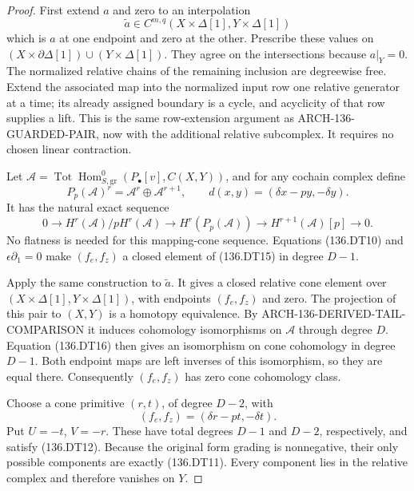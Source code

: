 \begin{proof}
First extend \(a\) and zero to an interpolation
\[
  \widetilde a\in C^{m,q}(X\times\Delta[1],Y\times\Delta[1])
                                                        \tag{136.DT14}
\]
which is \(a\) at one endpoint and zero at the other.
Prescribe these values on
\((X\times\partial\Delta[1])\cup(Y\times\Delta[1])\).
They agree on the intersections because \(a|_Y=0\).
The normalized relative chains of the remaining inclusion are
degreewise free. Extend the associated map into the normalized
input row one relative generator at a time; its already assigned
boundary is a cycle, and acyclicity of that row supplies a lift.
This is the same row-extension argument as
ARCH-136-GUARDED-PAIR, now with the additional relative subcomplex.
It requires no chosen linear contraction.

Let \(\mathcal A=\operatorname{Tot}
\operatorname{Hom}^{0}_{S,\mathrm{gr}}
(P_\bullet[v],C(X,Y))\), and for any cochain complex define
\[
 P_p(\mathcal A)^r=\mathcal A^r\oplus\mathcal A^{r+1},
 \qquad d(x,y)=(\delta x-py,-\delta y).
                                                        \tag{136.DT15}
\]
It has the natural exact sequence
\[
 0\longrightarrow H^r(\mathcal A)/pH^r(\mathcal A)
 \longrightarrow H^r(P_p(\mathcal A))
 \longrightarrow H^{r+1}(\mathcal A)[p]
 \longrightarrow0.                                    \tag{136.DT16}
\]
No flatness is needed for this mapping-cone sequence.
Equations (136.DT10) and \(\epsilon\partial_1=0\) make
\((f_e,f_z)\) a closed element of (136.DT15) in degree
\(D-1\).

Apply the same construction to \(\widetilde a\). It gives a
closed relative cone element over
\((X\times\Delta[1],Y\times\Delta[1])\), with endpoints
\((f_e,f_z)\) and zero. The projection of this pair to \((X,Y)\)
is a homotopy equivalence. By ARCH-136-DERIVED-TAIL-COMPARISON
it induces cohomology isomorphisms on \(\mathcal A\) through
degree \(D\). Equation (136.DT16) then gives an isomorphism
on cone cohomology in degree \(D-1\). Both endpoint maps are
left inverses of this isomorphism, so they are equal there.
Consequently \((f_e,f_z)\) has zero cone cohomology class.

Choose a cone primitive \((r,t)\), of degree \(D-2\), with
\[
             (f_e,f_z)=(\delta r-pt,-\delta t).
\]
Put \(U=-t\), \(V=-r\). These have total degrees \(D-1\)
and \(D-2\), respectively, and satisfy (136.DT12).
Because the original form grading is nonnegative, their only
possible components are exactly (136.DT11). Every component
lies in the relative complex and therefore vanishes on \(Y\).


\end{proof}
